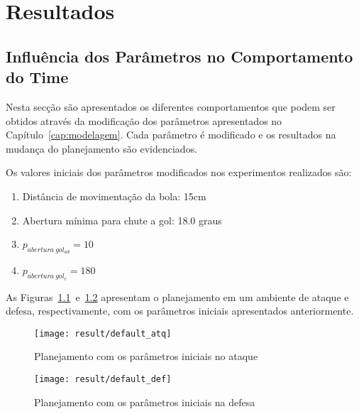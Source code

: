 \chapter{Resultados}\label{cap:resultados}



\section{Influência dos Parâmetros no Comportamento do Time}

Nesta secção são apresentados os diferentes comportamentos que podem ser obtidos
através da modificação dos parâmetros apresentados no
Capítulo~\ref{cap:modelagem}.  Cada parâmetro é modificado e os resultados na
mudança do planejamento são evidenciados.

Os valores iniciais dos parâmetros modificados nos experimentos realizados são:

\begin{enumerate}
  \item Distância de movimentação da bola: 15cm
  \item Abertura mínima para chute a gol: 18.0 graus
  \item $p_{abertura{\ }gol_{ad}} = 10$
  \item $p_{abertura{\ }gol_{c}} = 180$
\end{enumerate}

As Figuras~\ref{fig:default_atq}~e~\ref{fig:default_def} apresentam o
planejamento em um ambiente de ataque e defesa, respectivamente, com os
parâmetros iniciais apresentados anteriormente.

\begin{figure}[H]
  \centering
  \texttt{[image: result/default\_atq]}
  \caption{Planejamento com os parâmetros iniciais no
           ataque}\label{fig:default_atq}
\end{figure}
\begin{figure}[H]
  \centering
  \texttt{[image: result/default\_def]}
  \caption{Planejamento com os parâmetros iniciais
           na defesa}\label{fig:default_def}
\end{figure}

